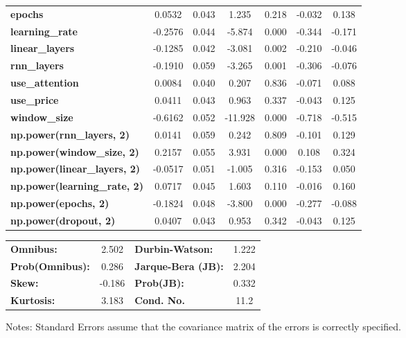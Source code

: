 \begin{center}
\begin{tabular}{lcccccc}
\textbf{epochs}                            &       0.0532  &        0.043     &     1.235  &         0.218        &       -0.032    &        0.138     \\
\textbf{learning\_rate}                    &      -0.2576  &        0.044     &    -5.874  &         0.000        &       -0.344    &       -0.171     \\
\textbf{linear\_layers}                    &      -0.1285  &        0.042     &    -3.081  &         0.002        &       -0.210    &       -0.046     \\
\textbf{rnn\_layers}                       &      -0.1910  &        0.059     &    -3.265  &         0.001        &       -0.306    &       -0.076     \\
\textbf{use\_attention}                    &       0.0084  &        0.040     &     0.207  &         0.836        &       -0.071    &        0.088     \\
\textbf{use\_price}                        &       0.0411  &        0.043     &     0.963  &         0.337        &       -0.043    &        0.125     \\
\textbf{window\_size}                      &      -0.6162  &        0.052     &   -11.928  &         0.000        &       -0.718    &       -0.515     \\
\textbf{np.power(rnn\_layers, 2)}          &       0.0141  &        0.059     &     0.242  &         0.809        &       -0.101    &        0.129     \\
\textbf{np.power(window\_size, 2)}         &       0.2157  &        0.055     &     3.931  &         0.000        &        0.108    &        0.324     \\
\textbf{np.power(linear\_layers, 2)}       &      -0.0517  &        0.051     &    -1.005  &         0.316        &       -0.153    &        0.050     \\
\textbf{np.power(learning\_rate, 2)}       &       0.0717  &        0.045     &     1.603  &         0.110        &       -0.016    &        0.160     \\
\textbf{np.power(epochs, 2)}               &      -0.1824  &        0.048     &    -3.800  &         0.000        &       -0.277    &       -0.088     \\
\textbf{np.power(dropout, 2)}              &       0.0407  &        0.043     &     0.953  &         0.342        &       -0.043    &        0.125     \\
\bottomrule
\end{tabular}
\begin{tabular}{lclc}
\textbf{Omnibus:}       &  2.502 & \textbf{  Durbin-Watson:     } &    1.222  \\
\textbf{Prob(Omnibus):} &  0.286 & \textbf{  Jarque-Bera (JB):  } &    2.204  \\
\textbf{Skew:}          & -0.186 & \textbf{  Prob(JB):          } &    0.332  \\
\textbf{Kurtosis:}      &  3.183 & \textbf{  Cond. No.          } &     11.2  \\
\bottomrule
\end{tabular}
\end{center}

Notes: \newline
 [1] Standard Errors assume that the covariance matrix of the errors is correctly specified.